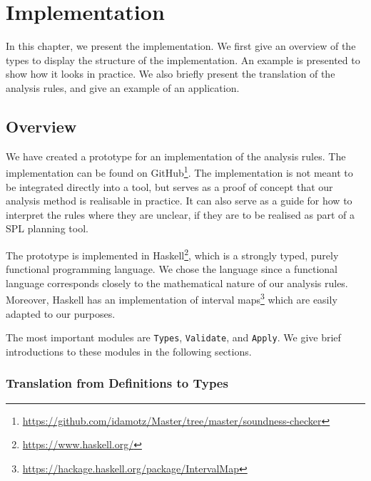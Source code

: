 \chapter{Implementation}  
\label{cha:implementation}

In this chapter, we present the implementation. We first give an overview of the types to display the structure of the implementation. An example is presented to show how it looks in practice. We also briefly present the translation of the analysis rules, and give an example of an application.


\section{Overview}
\label{sec:overview}
We have created a prototype for an implementation of the analysis rules. The implementation can be found on GitHub\footnote{\url{https://github.com/idamotz/Master/tree/master/soundness-checker}}. The implementation is not meant to be integrated directly into a tool, but serves as a proof of concept that our analysis method is realisable in practice. It can also serve as a guide for how to interpret the rules where they are unclear, if they are to be realised as part of a SPL planning tool. 

The prototype is implemented in Haskell\footnote{\url{https://www.haskell.org/}}, which is a strongly typed, purely functional programming language. We chose the language since a functional language corresponds closely to the mathematical nature of our analysis rules. Moreover, Haskell has an implementation of interval maps\footnote{\url{https://hackage.haskell.org/package/IntervalMap}} which are easily adapted to our purposes. 

The most important modules are \texttt{Types},
\texttt{Validate}, and \texttt{Apply}. We give brief introductions to these modules in the following sections. 

\subsection{Translation from Definitions to Types}
\label{sub:the-types-module}

